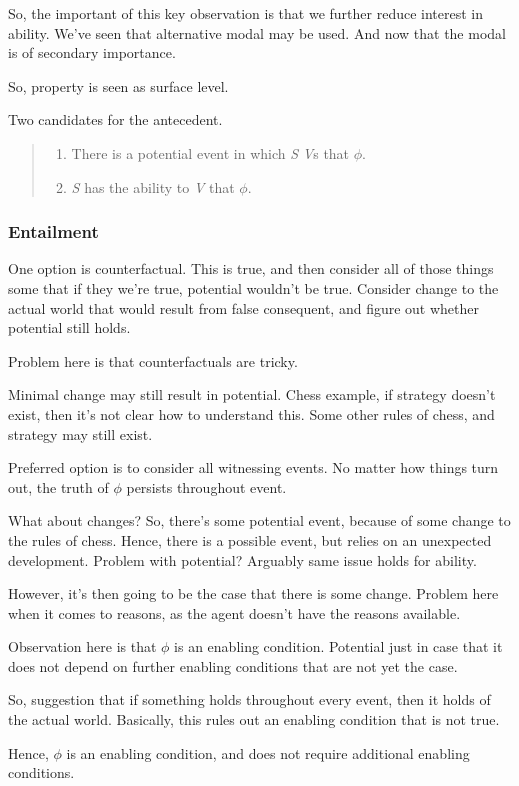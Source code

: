 \begin{note}
  So, the important of this key observation is that we further reduce interest in ability.
  We've seen that alternative modal may be used.
  And now that the modal is of secondary importance.

  So, property is seen as surface level.

  Two candidates for the antecedent.
  \begin{quote}
    \begin{enumerate}
    \item There is a potential event in which \emph{S} \emph{V}s that \(\phi\).
    \item \emph{S} has the ability to \emph{V} that \(\phi\).
    \end{enumerate}
  \end{quote}
\end{note}


\subsubsection{Entailment}
\label{sec:entailment-1}




\begin{note}[Counterfactual]
  One option is counterfactual.
  This is true, and then consider all of those things some that if they we're true, potential wouldn't be true.
  Consider change to the actual world that would result from false consequent, and figure out whether potential still holds.

  Problem here is that counterfactuals are tricky.

  Minimal change may still result in potential.
  Chess example, if strategy doesn't exist, then it's not clear how to understand this.
  Some other rules of chess, and strategy may still exist.
\end{note}

\begin{note}
  Preferred option is to consider all witnessing events.
  No matter how things turn out, the truth of \(\phi\) persists throughout event.

  What about changes?
  So, there's some potential event, because of some change to the rules of chess.
  Hence, there is a possible event, but relies on an unexpected development.
  Problem with potential?
  Arguably same issue holds for ability.

  However, it's then going to be the case that there is some change.
  Problem here when it comes to reasons, as the agent doesn't have the reasons available.

  Observation here is that \(\phi\) is an enabling condition.
  Potential just in case that it does not depend on further enabling conditions that are not yet the case.


  So, suggestion that if something holds throughout every event, then it holds of the actual world.
  Basically, this rules out an enabling condition that is not true.

  Hence, \(\phi\) is an enabling condition, and does not require additional enabling conditions.
\end{note}

